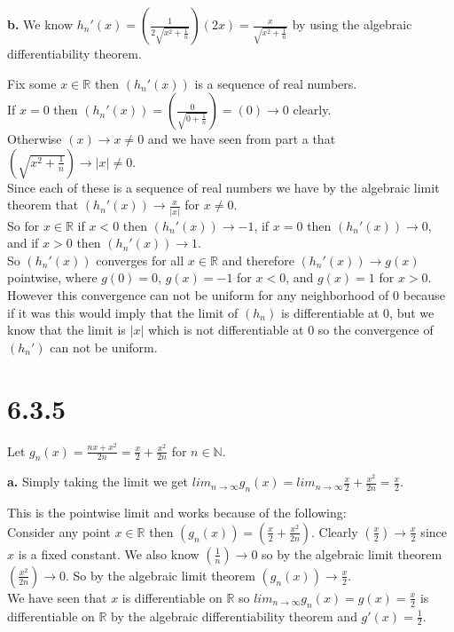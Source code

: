 \documentclass{article}
\begin{document}
{\Large\textbf{b.}} We know $h_n' (x) =(\frac{1}{2\sqrt{x^2 +\frac{1}{n}}})(2x) =\frac{x}{\sqrt{x^2 +\frac{1}{n}}}$ by using the algebraic differentiability theorem.
\begin{center}
    \doublespacing
    Fix some $x\in\mathbb{R}$ then $(h_n '(x))$ is a sequence of real numbers.
    \\If $x = 0$ then $(h_n '(x)) = (\frac{0}{\sqrt{0 +\frac{1}{n}}}) = (0)\rightarrow 0$ clearly.
    \\Otherwise $(x)\rightarrow x\neq 0$ and we have seen from part a that $(\sqrt{x^2 +\frac{1}{n}})\rightarrow |x|\neq 0$.
    \\Since each of these is a sequence of real numbers we have by the algebraic limit theorem that $(h_n '(x))\rightarrow\frac{x}{|x|}$ for $x\neq 0$.
    \\So for $x\in\mathbb{R}$ if $x < 0$ then $(h_n '(x))\rightarrow -1$, if $x = 0$ then $(h_n '(x))\rightarrow 0$, and if $x > 0$ then $(h_n '(x))\rightarrow 1$.
    \\So $(h_n '(x))$ converges for all $x\in\mathbb{R}$ and therefore $(h_n '(x))\rightarrow g(x)$ pointwise, where $g(0) = 0$, $g(x) = -1$ for $x < 0$, and $g(x) = 1$ for $x > 0$.
    \break
    \\However this convergence can not be uniform for any neighborhood of 0 because if it was this would imply that the limit of $(h_n)$ is differentiable at 0, but we know that the limit is $|x|$ which is not differentiable at 0 so the convergence of $(h_n ')$ can not be uniform.
\end{center}


\newpage
\section*{6.3.5}
\begin{center}
    \doublespacing
    Let $g_n (x) =\frac{nx +x^2}{2n} =\frac{x}{2} +\frac{x^2}{2n}$ for $n\in\mathbb{N}$.
\end{center}

{\Large\textbf{a.}} Simply taking the limit we get $lim_{n\rightarrow\infty } g_n (x) = lim_{n\rightarrow\infty } \frac{x}{2} +\frac{x^2}{2n} =\frac{x}{2}$.
\begin{center}
    \doublespacing
    This is the pointwise limit and works because of the following:
    \\Consider any point $x\in\mathbb{R}$ then $(g_n (x)) =(\frac{x}{2} +\frac{x^2}{2n})$. Clearly $(\frac{x}{2})\rightarrow\frac{x}{2}$ since $x$ is a fixed constant. We also know $(\frac{1}{n})\rightarrow 0$ so by the algebraic limit theorem $(\frac{x^2}{2n})\rightarrow 0$. So by the algebraic limit theorem $(g_n (x))\rightarrow\frac{x}{2}$.
    \\We have seen that $x$ is differentiable on $\mathbb{R}$ so $lim_{n\rightarrow\infty } g_n (x) = g(x) =\frac{x}{2}$ is differentiable on $\mathbb{R}$ by the algebraic differentiability theorem and $g' (x) =\frac{1}{2}$.
\end{center}
\end{document}
